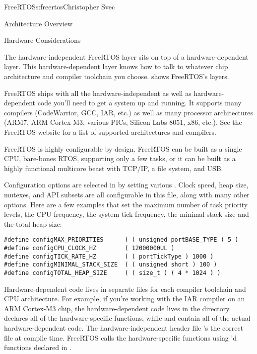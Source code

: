 \begin{aosachapter}{FreeRTOS}{s:freertos}{Christopher Svec}
\begin{aosasect1}{Architecture Overview}
\begin{aosaitemize}
\end{aosaitemize}

\begin{aosasect2}{Hardware Considerations}

The hardware-independent FreeRTOS layer sits on top of a
hardware-dependent layer.  This hardware-dependent layer knows how to
talk to whatever chip architecture and compiler toolchain you
choose.  shows FreeRTOS's layers.


FreeRTOS ships with all the hardware-independent as well as
hardware-dependent code you'll need to get a system up and running. It
supports many compilers (CodeWarrior, GCC, IAR, etc.) as well as many
processor architectures (ARM7, ARM Cortex-M3, various PICs, Silicon
Labs 8051, x86, etc.). See the FreeRTOS website for a list of supported
architectures and compilers.

FreeRTOS is highly configurable by design. FreeRTOS can be built as a
single CPU, bare-bones RTOS, supporting only a few
tasks, or it can be built as a highly functional multicore beast with
TCP/IP, a file system, and USB.

Configuration options are selected in  by
setting various . Clock speed, heap size, mutexes, and
API subsets are all configurable in this file, along with many other
options. Here are a few examples that set the maximum number of task
priority levels, the CPU frequency, the system tick frequency, the
minimal stack size and the total heap size:

\begin{verbatim}
#define configMAX_PRIORITIES      ( ( unsigned portBASE_TYPE ) 5 )
#define configCPU_CLOCK_HZ        ( 12000000UL )
#define configTICK_RATE_HZ        ( ( portTickType ) 1000 )
#define configMINIMAL_STACK_SIZE  ( ( unsigned short ) 100 )
#define configTOTAL_HEAP_SIZE     ( ( size_t ) ( 4 * 1024 ) )
\end{verbatim}

Hardware-dependent code lives in separate files for each compiler
toolchain and CPU architecture. For example, if you're working with
the IAR compiler on an ARM Cortex-M3 chip, the hardware-dependent code
lives in the  directory.
 declares all of the hardware-specific functions,
while  and  contain all of the actual
hardware-dependent code. The hardware-independent header file
 's the correct 
file at compile time.  FreeRTOS calls the hardware-specific functions
using 'd functions declared in .


\end{aosasect2}
\end{aosasect1}
\end{aosachapter}

